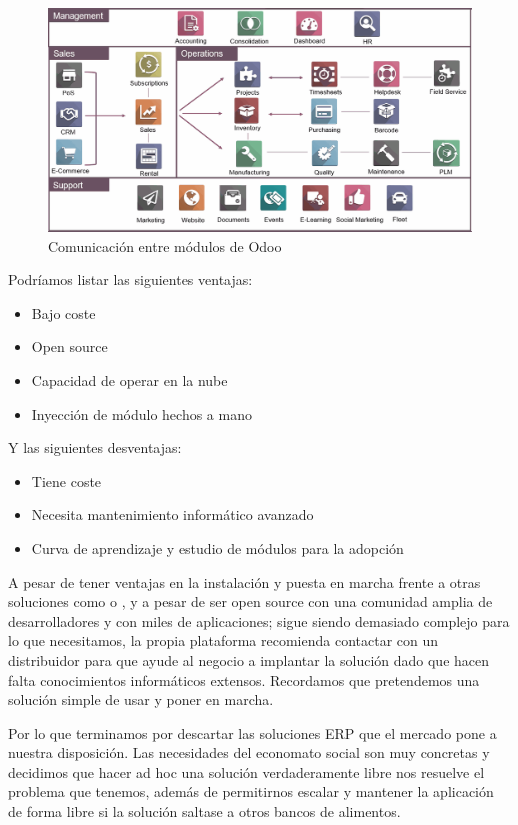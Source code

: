 \clearpage
\begin{figure}[h]
\centering
\includegraphics[scale=0.38]{archivos/odooModules2.png}
\caption{Comunicación entre módulos de Odoo}
\label{fig:odooModules_comunicacion}
\end{figure}
\par Podríamos listar las siguientes ventajas:
\begin{itemize}
    \item Bajo coste
    \item Open source
    \item Capacidad de operar en la nube
    \item Inyección de módulo hechos a mano
\end{itemize}
Y las siguientes desventajas:
\begin{itemize}
    \item Tiene coste
    \item Necesita mantenimiento informático avanzado
    \item Curva de aprendizaje y estudio de módulos para la adopción
\end{itemize}
\vspace{0.5em}
\par A pesar de tener ventajas en la instalación y puesta en marcha frente a otras soluciones como \citep{oracleERP} o \citep{sapERP}, y a pesar de ser open source con una comunidad amplia de desarrolladores y con miles de aplicaciones; sigue siendo demasiado complejo para lo que necesitamos, la propia plataforma recomienda contactar con un distribuidor para que ayude al negocio a implantar la solución dado que hacen falta conocimientos informáticos extensos. Recordamos que pretendemos una solución simple de usar y poner en marcha.
\vspace{0.5em}
\par Por lo que terminamos por descartar las soluciones ERP que el mercado pone a nuestra disposición. Las necesidades del economato social son muy concretas y decidimos que hacer ad hoc una solución verdaderamente libre nos resuelve el problema que tenemos, además de permitirnos escalar y mantener la aplicación de forma libre si la solución saltase a otros bancos de alimentos.
\clearpage
